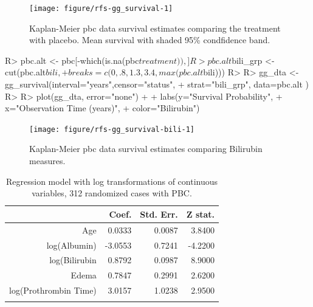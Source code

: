\documentclass[nojss]{jss}
\begin{document}
\begin{Schunk}
\begin{figure}[!htpb]

{\centering \texttt{[image: figure/rfs-gg\_survival-1]} 

}

\caption[Kaplan-Meier pbc data survival estimates comparing the treatment with placebo]{Kaplan-Meier pbc data survival estimates comparing the treatment with placebo. Mean survival with shaded 95\% condfidence band.\label{fig:gg_survival}}
\end{figure}
\end{Schunk}

\begin{Schunk}
\begin{Sinput}
R> pbc.alt <- pbc[-which(is.na(pbc$treatment)),]
R> pbc.alt$bili_grp <- cut(pbc.alt$bili, 
+                         breaks=c(0,.8,1.3,3.4,max(pbc.alt$bili)))
R> 
R> gg_dta <- gg_survival(interval="years",censor="status", 
+                       strat="bili_grp", data=pbc.alt )
R> 
R> plot(gg_dta, error="none") +
+   labs(y="Survival Probability", 
+        x="Observation Time (years)", 
+        color="Bilirubin")
\end{Sinput}
\begin{figure}[!htpb]

{\centering \texttt{[image: figure/rfs-gg\_survival-bili-1]} 

}

\caption[Kaplan-Meier pbc data survival estimates comparing Bilirubin measures]{Kaplan-Meier pbc data survival estimates comparing Bilirubin measures.\label{fig:gg_survival-bili}}
\end{figure}
\end{Schunk}

\begin{table}[ht]
\centering
{\footnotesize
\begin{tabular}{rrrr}
  \toprule
 & Coef. & Std. Err. & Z stat. \\ 
  \midrule
Age & 0.0333 & 0.0087 & 3.8400 \\ 
   \rowcolor[gray]{0.95}log(Albumin) & -3.0553 & 0.7241 & -4.2200 \\ 
  log(Bilirubin & 0.8792 & 0.0987 & 8.9000 \\ 
   \rowcolor[gray]{0.95}Edema & 0.7847 & 0.2991 & 2.6200 \\ 
  log(Prothrombin Time) & 3.0157 & 1.0238 & 2.9500 \\ 
   \rowcolor[gray]{0.95} \bottomrule
\end{tabular}
}
\caption{Regression model with log transformations of continuous variables, 312 randomized cases with PBC.} 
\label{T:FHmodel}
\end{table}
\end{document}
